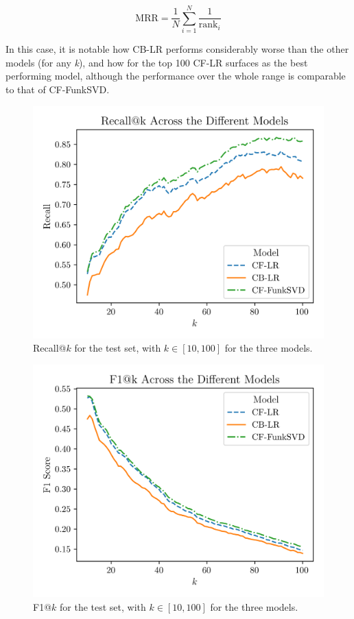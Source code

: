 \documentclass[conference]{IEEEtran}
\begin{document}
\begin{equation}
\text{MRR} = \frac{1}{N} \sum_{i=1}^{N} \frac{1}{\text{rank}_i}
\end{equation}

In this case, it is notable how CB-LR performs considerably worse than the other models (for any \textit{k}), and how for the top 100 CF-LR surfaces as the best performing model, although the performance over the whole range is comparable to that of CF-FunkSVD.

\begin{figure}[H]
    \centering
    \includegraphics[width=1\linewidth]{assets/results_recallK.png}
    \caption{Recall@$k$ for the test set, with $k \in [10,100]$ for the three models.}
    \label{fig:results_recallK}
\end{figure}

\begin{figure}[H]
    \centering
    \includegraphics[width=1\linewidth]{assets/results_f1K.png}
    \caption{F1@$k$ for the test set, with $k \in [10,100]$ for the three models.}
    \label{fig:results_f1K}
\end{figure}
\end{document}
